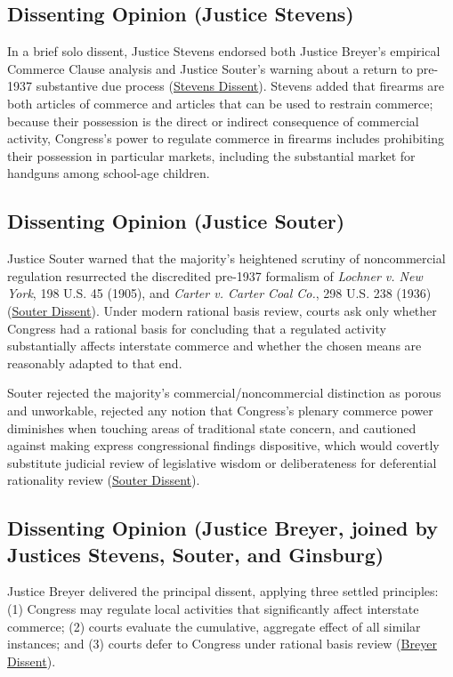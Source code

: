 \documentclass[12pt]{article}
\begin{document}
\subsection{Dissenting Opinion (Justice Stevens)}
In a brief solo dissent, Justice Stevens endorsed both Justice Breyer's empirical Commerce Clause analysis and Justice Souter's warning about a return to pre-1937 substantive due process (\href{https://www.law.cornell.edu/supct/html/93-1260.ZD.html}{Stevens Dissent}). Stevens added that firearms are both articles of commerce and articles that can be used to restrain commerce; because their possession is the direct or indirect consequence of commercial activity, Congress's power to regulate commerce in firearms includes prohibiting their possession in particular markets, including the substantial market for handguns among school-age children.

\subsection{Dissenting Opinion (Justice Souter)}
Justice Souter warned that the majority's heightened scrutiny of noncommercial regulation resurrected the discredited pre-1937 formalism of \textit{Lochner v. New York}, 198 U.S. 45 (1905), and \textit{Carter v. Carter Coal Co.}, 298 U.S. 238 (1936) (\href{https://www.law.cornell.edu/supct/html/93-1260.ZD1.html}{Souter Dissent}). Under modern rational basis review, courts ask only whether Congress had a rational basis for concluding that a regulated activity substantially affects interstate commerce and whether the chosen means are reasonably adapted to that end.

Souter rejected the majority's commercial/noncommercial distinction as porous and unworkable, rejected any notion that Congress's plenary commerce power diminishes when touching areas of traditional state concern, and cautioned against making express congressional findings dispositive, which would covertly substitute judicial review of legislative wisdom or deliberateness for deferential rationality review (\href{https://www.law.cornell.edu/supct/html/93-1260.ZD1.html}{Souter Dissent}).

\subsection{Dissenting Opinion (Justice Breyer, joined by Justices Stevens, Souter, and Ginsburg)}
Justice Breyer delivered the principal dissent, applying three settled principles: (1) Congress may regulate local activities that significantly affect interstate commerce; (2) courts evaluate the cumulative, aggregate effect of all similar instances; and (3) courts defer to Congress under rational basis review (\href{https://www.law.cornell.edu/supct/html/93-1260.ZD2.html}{Breyer Dissent}).
\end{document}
